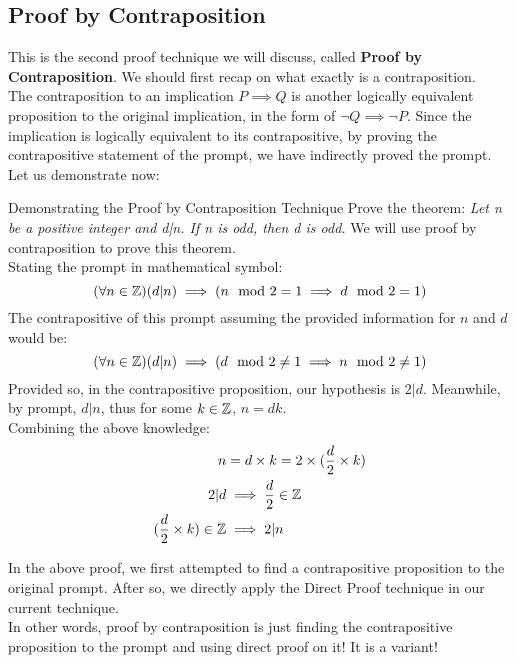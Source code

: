 \subsection{Proof by Contraposition}
This is the second proof technique we will discuss, called \textbf{Proof by Contraposition}. We should first recap on what exactly is a contraposition. \\
The contraposition to an implication $P \implies Q$ is another logically equivalent proposition to the original implication, in the form of $\neg Q \implies \neg P$. Since the implication is logically equivalent to its contrapositive, by proving the contrapositive statement of the prompt, we have indirectly proved the prompt. \\
Let us demonstrate now:
\begin{ln-think}{Demonstrating the Proof by Contraposition Technique}{}
    Prove the theorem: \textit{Let n be a positive integer and d|n. If n is odd, then d is odd.}
    \tcblower
    We will use proof by contraposition to prove this theorem. \\
    Stating the prompt in mathematical symbol:
    \[(\forall n \in \mathbb{Z})(d|n) \implies (n \mod 2 = 1 \implies d \mod 2 = 1)\]
    The contrapositive of this prompt assuming the provided information for $n$ and $d$ would be:
    \[(\forall n \in \mathbb{Z})(d|n) \implies (d \mod 2 \neq 1 \implies n \mod 2 \neq 1)\]
    Provided so, in the contrapositive proposition, our hypothesis is $2|d$. Meanwhile, by prompt, $d|n$, thus for some $k \in \mathbb{Z}$, $n = dk$. \\
    Combining the above knowledge:
    \begin{align*}
        n &= d \times k = 2 \times (\frac{d}{2} \times k) \\
        2|d &\implies \frac{d}{2} \in \mathbb{Z}\\
        (\frac{d}{2} \times k) \in \mathbb{Z} &\implies 2|n
    \end{align*}
\end{ln-think}
In the above proof, we first attempted to find a contrapositive proposition to the original prompt. After so, we directly apply the Direct Proof technique in our current technique. \\
In other words, proof by contraposition is just finding the contrapositive proposition to the prompt and using direct proof on it! It is a variant!


